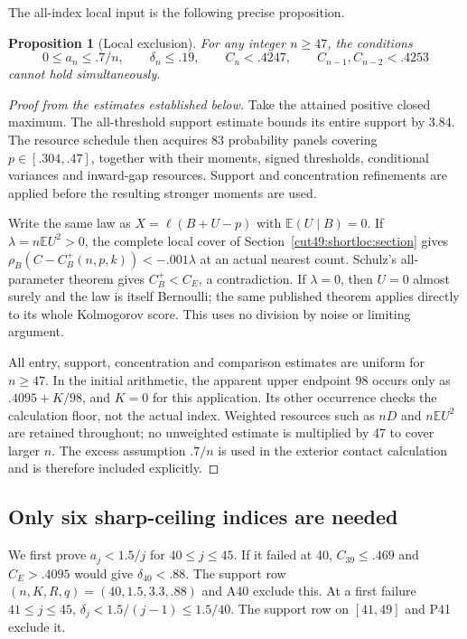 \documentclass[11pt,a4paper]{article}
\numberwithin{equation}{section}
\newtheorem{proposition}[theorem]{Proposition}
\theoremstyle{definition}
\theoremstyle{remark}
\begin{document}
The all-index local input is the following precise proposition.
\begin{proposition}[Local exclusion]\label{cut49:global:local}
For any integer $n\ge47$, the conditions
\[
 0\le a_n\le.7/n,\qquad \delta_n\le.19,\qquad
 C_n<.4247,\qquad C_{n-1},C_{n-2}<.4253
\]
cannot hold simultaneously.
\end{proposition}
\begin{proof}[Proof from the estimates established below]
Take the attained positive closed maximum. The all-threshold support
estimate bounds its entire support by 3.84. The resource schedule then
acquires 83 probability panels covering $p\in[.304,.47]$, together with
their moments, signed thresholds, conditional variances and inward-gap
resources. Support and concentration refinements are applied before
the resulting stronger moments are used.

Write the same law as $X=\ell(B+U-p)$ with
$\mathbb E(U\mid B)=0$. If $\lambda=n\mathbb E U^2>0$, the complete
local cover of Section~\ref{cut49:shortloc:section} gives
$\rho_B(C-C_B^+(n,p,k))<-.001\lambda$ at an actual nearest count.
Schulz's all-parameter theorem gives $C_B^+<C_E$, a contradiction.
If $\lambda=0$, then $U=0$ almost surely and the law is itself
Bernoulli; the same published theorem applies directly to its whole
Kolmogorov score. This uses no division by noise or limiting argument.

All entry, support, concentration and comparison estimates are uniform
for $n\ge47$. In the initial arithmetic, the apparent upper endpoint 98
occurs only as $.4095+K/98$, and $K=0$ for this application. Its other
occurrence checks the calculation floor, not the actual index.
Weighted resources such as $nD$ and $n\mathbb E U^2$ are retained
throughout; no unweighted estimate is multiplied by 47 to cover larger
$n$. The excess assumption $.7/n$ is used in the exterior contact
calculation and is therefore included explicitly.
\end{proof}

\subsection{Only six sharp-ceiling indices are needed}
We first prove $a_j<1.5/j$ for $40\le j\le45$. If it failed at 40,
$C_{39}\le.469$ and $C_E>.4095$ would give $\delta_{40}<.88$.
The support row $(n,K,R,q)=(40,1.5,3.3,.88)$ and A40 exclude this.
At a first failure $41\le j\le45$,
$\delta_j<1.5/(j-1)\le1.5/40$. The support row on $[41,49]$
and P41 exclude it.
\end{document}

